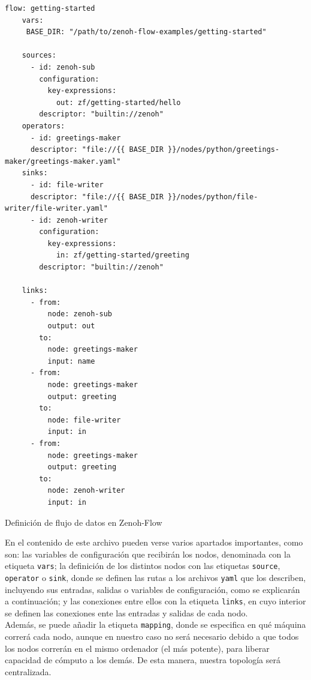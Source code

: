 \begin{code}[h!]
  \begin{lstlisting}[style=yaml]
    flow: getting-started
    vars:
     BASE_DIR: "/path/to/zenoh-flow-examples/getting-started"
    
    sources:
      - id: zenoh-sub
        configuration:
          key-expressions:
            out: zf/getting-started/hello
        descriptor: "builtin://zenoh"
    operators:
      - id: greetings-maker
      descriptor: "file://{{ BASE_DIR }}/nodes/python/greetings-maker/greetings-maker.yaml"
    sinks:
      - id: file-writer
      descriptor: "file://{{ BASE_DIR }}/nodes/python/file-writer/file-writer.yaml"
      - id: zenoh-writer
        configuration:
          key-expressions:
            in: zf/getting-started/greeting
        descriptor: "builtin://zenoh"
    
    links:
      - from:
          node: zenoh-sub
          output: out
        to:
          node: greetings-maker
          input: name
      - from:
          node: greetings-maker
          output: greeting
        to:
          node: file-writer
          input: in
      - from:
          node: greetings-maker
          output: greeting
        to:
          node: zenoh-writer
          input: in
  \end{lstlisting}
\caption[Definición de flujo de datos en Zenoh-Flow]{Definición de flujo de datos en Zenoh-Flow}
\label{cod:data_flow_example}
\end{code}

En el contenido de este archivo pueden verse varios apartados importantes, como
son: las variables de configuración que recibirán los nodos, denominada con la
etiqueta \verb|vars|; la definición de los distintos nodos con las etiquetas
\verb|source|, \verb|operator| o \verb|sink|, donde se definen las rutas a los
archivos \texttt{yaml} que los describen, incluyendo sus entradas, salidas o
variables de configuración, como se explicarán a continuación; y las conexiones
entre ellos con la etiqueta \verb|links|, en cuyo interior se definen las
conexiones ente las entradas y salidas de cada nodo.
\\

Además, se puede añadir la etiqueta \verb|mapping|, donde se especifica en qué
máquina correrá cada nodo, aunque en nuestro caso no será necesario debido a que
todos los nodos correrán en el mismo ordenador (el más potente), para liberar
capacidad de cómputo a los demás.
De esta manera, nuestra topología será centralizada.
\\

